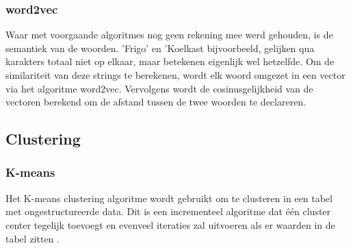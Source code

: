 \subsubsection{word2vec}
Waar met voorgaande algoritmes nog geen rekening mee werd gehouden, is de semantiek van de woorden. 'Frigo' en 'Koelkast bijvoorbeeld, gelijken qua karakters totaal niet op elkaar, maar betekenen eigenlijk wel hetzelfde. Om de similariteit van deze strings te berekenen, wordt elk woord omgezet in een vector via het algoritme word2vec. Vervolgens wordt de cosinusgelijkheid van de vectoren berekend om de afstand tussen de twee woorden te declareren.\autocite{Lievens2022}
\subsection{Clustering}
\subsubsection{K-means}
Het K-means clustering algoritme wordt gebruikt om te clusteren in een tabel met ongestructureerde data. Dit is een incrementeel algoritme dat één cluster center tegelijk toevoegt en evenveel iteraties zal uitvoeren als er waarden in de tabel zitten \autocite{Likas2003}.






%

